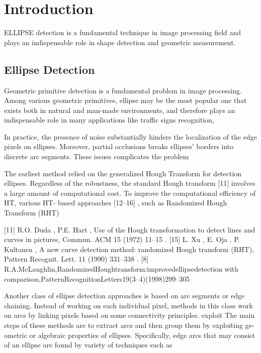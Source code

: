 \documentclass[a4paper]{report}
\begin{document}
\section{Introduction}




ELLIPSE detection is a fundamental technique in image processing field and plays an indispensable role in shape
detection and geometric measurement.


\subsection{Ellipse Detection}
Geometric primitive detection is a fundamental problem in image processing. Among various geometric primitives, ellipse may be the most popular one that exists both in natural and man-made environments, and therefore plays an indispensable role in many applications like traffic signs recognition, 


In practice, the presence of noise substantially hinders the localization of the edge pixels on ellipses. Moreover, partial occlusions breaks ellipses' borders into discrete arc segments. These issues complicates the problem 


The earliest method relied on the generalized Hough Transform for detection ellipses. 
Regardless of the robustness, the standard Hough transform [11] involves a large amount of computational cost.
To improve the computational efficiency of HT, various HT- based approaches [12–16] , such as Randomized Hough Transform (RHT)


[11] R.O. Duda , P.E. Hart , Use of the Hough transformation to detect lines and curves in pictures, Commun. ACM 15 (1972) 11–15 .
[15] L. Xu , E. Oja , P. Kultanen , A new curve detection method: randomized Hough transform (RHT), Pattern Recognit. Lett. 11 (1990) 331–338 .
[8] R.A.McLaughlin,RandomizedHoughtransform:improvedellipsedetection
with comparison,PatternRecognitionLetters19(3–4)(1998)299–305

Another class of ellipse detection approaches is based on arc segments or edge chaining. 
Instead of working on each individual pixel, methods in this class work on arcs by linking pixels based on some connectivity principles.
exploit
The main steps of these methods are to extract arcs and then group them by exploiting ge- ometric or algebraic properties of ellipses.
Specifically, edge arcs that may consist of an ellipse are found by variety of techniques such as
\end{document}
